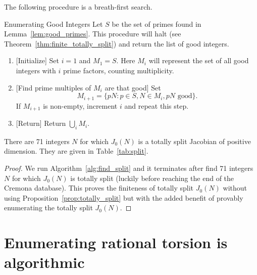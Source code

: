 The following procedure is a breath-first search.
\begin{algorithm}{Enumerating Good Integers}
    \label{alg:find_split}
    Let $S$ be the set of primes found in Lemma~\ref{lem:good_primes}. This
    procedure will halt (see Theorem~\ref{thm:finite_totally_split}) and return
    the list of good integers.
\end{algorithm}
\begin{enumerate}
    \item{} [Initialize]
        \label{step:initialize}
        Set $i=1$ and $M_1=S$. Here $M_i$ will represent the set of all good
        integers with $i$ prime factors, counting multiplicity.
    \item{} [Find prime multiples of $M_i$ are that good]
        Set
        \[
            M_{i+1}=\{pN: p\in S, N\in M_i, pN \text{ good}\}.
        \]
        If $M_{i+1}$ is non-empty, increment $i$ and repeat this step.
    \item{} [Return]
        Return $\bigcup_i M_i$.
\end{enumerate}
\begin{theorem}
    \label{thm:finite_totally_split}
    There are 71 integers $N$ for which $J_0(N)$ is a totally split Jacobian of
    positive dimension. They are given in Table~\ref{tab:split}.
\end{theorem}
\begin{proof}
    We run Algorithm~\ref{alg:find_split} and it terminates after find 71
    integers $N$ for which $J_0(N)$ is totally split (luckily before reaching
    the end of the Cremona database). This proves the finiteness of totally
    split $J_0(N)$ without using Proposition~\ref{prop:totally_split} but with
    the added benefit of provably enumerating the totally split $J_0(N)$.
\end{proof}

\section{Enumerating rational torsion is algorithmic}
\label{sec:enumerating_is_algorithmic}

